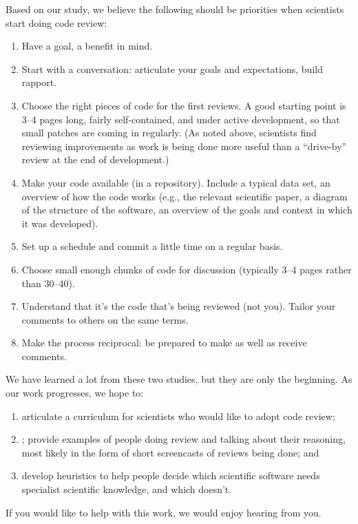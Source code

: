\documentclass[10pt,twocolumn]{article}
\begin{document}
Based on our study,
we believe the following should be priorities when scientists start doing code review:

\begin{enumerate}

\item Have a goal, a benefit in mind.

\item Start with a conversation:
articulate your goals and expectations, build rapport.

\item Choose the right pieces of code for the first reviews.
A good starting point is 3--4 pages long,
fairly self-contained,
and under active development,
so that small patches are coming in regularly.
(As noted above,
scientists find reviewing improvements as work is being done
more useful than a ``drive-by'' review at the end of development.)

\item Make your code available (in a repository).
Include a typical data set, an overview of how the code works
(e.g.,
the relevant scientific paper,
a diagram of the structure of the software,
an overview of the goals and context in which it was developed).

\item Set up a schedule and commit a little time on a regular basis.

\item Choose small enough chunks of code for discussion (typically 3--4 pages rather than 30--40).

\item Understand that it's the code that's being reviewed (not you).
Tailor your comments to others on the same terms.

\item Make the process reciprocal:
be prepared to make as well as receive comments.

\end{enumerate}

We have learned a lot from these two studies,
but they are only the beginning.
As our work progresses,
we hope to:

\begin{enumerate}

\item
articulate a curriculum for scientists who would like to adopt code review;

\item;
provide examples of people doing review and talking about their reasoning,
most likely in the form of short screencasts of reviews being done;
and

\item
develop heuristics to help people decide
which scientific software needs specialist scientific knowledge,
and which doesn’t.

\end{enumerate}

If you would like to help with this work,
we would enjoy hearing from you.

{\small


}
\end{document}
